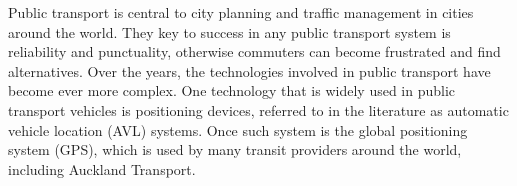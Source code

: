 \documentclass[12pt,a4paper]{article}
\begin{document}













Public transport is central to city planning and traffic management in cities around the world.
They key to success in any public transport system is reliability and punctuality,
otherwise commuters can become frustrated and find alternatives.
Over the years, the technologies involved in public transport have become ever more complex.
One technology that is widely used in public transport vehicles is positioning devices,
referred to in the literature as automatic vehicle location (AVL) systems.
Once such system is the global positioning system (GPS),
which is used by many transit providers around the world, including Auckland Transport.
\end{document}

